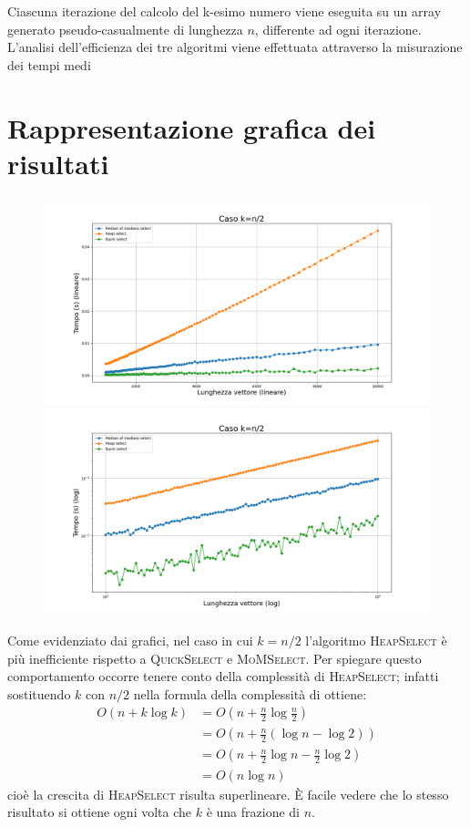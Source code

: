 \documentclass[a4paper]{article}
\newcommand{\QuickSelect}{\textsc{QuickSelect}}
\newcommand{\HeapSelect}{\textsc{HeapSelect}}
\newcommand{\MoMSelect}{\textsc{MoMSelect}}
\begin{document}
Ciascuna iterazione del calcolo del k-esimo numero viene eseguita su un array generato pseudo-casualmente di lunghezza \( n \), differente ad ogni iterazione.
L'analisi dell'efficienza dei tre algoritmi viene effettuata attraverso la misurazione dei tempi medi\\

\newpage

\section{Rappresentazione grafica dei risultati}
\label{sec:grafici}
\begin{figure}[h]
            \centering
            \includegraphics[width=.83\textwidth]{graphs/k_const_n.png}
            \includegraphics[width=.83\textwidth]{graphs/k_const_2xlog.png}
\end{figure}
Come evidenziato dai grafici, nel caso in cui $k=n/2$ l'algoritmo \HeapSelect{} è più inefficiente rispetto a \QuickSelect{} e \MoMSelect{}.
Per spiegare questo comportamento occorre tenere conto della complessità di \HeapSelect{}; infatti sostituendo $k$ con $n/2$ nella formula della complessità di ottiene:
\[\begin{split}
	O(n + k\log k) 	& = O\left(n + \frac{n}{2}\log \frac{n}{2}\right) \\
			& = O\left(n + \frac{n}{2}(\log n - \log 2)\right) \\
			& = O\left(n + \frac{n}{2}\log n - \frac{n}{2}\log 2\right) \\
			& = O(n \log n)
\end{split}\]
cioè la crescita di \HeapSelect{} risulta superlineare.
È facile vedere che lo stesso risultato si ottiene ogni volta che $k$ è una frazione di $n$.
\end{document}
